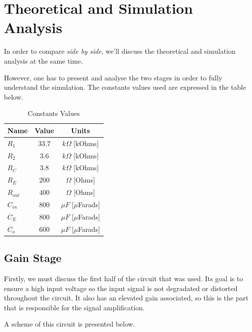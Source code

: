 \section{Theoretical and Simulation Analysis}
\label{sec:analysis}

In order to compare \textit{side by side}, we'll discuss the theoretical and simulation analysis at the same time.

However, one has to present and analyse the two stages in order to fully understand the simulation. The constants values used are expressed in the table below.

\begin{table}[h]
    \centering
    \begin{tabular}{|l|c|c|}
    \hline
    {\bf Name} & {\bf Value} & {\bf Units} \\ \hline
    $R_1$ & $33.7$ & $k\Omega$ [kOhms] \\ \hline
    $R_2$ & $3.6$ & $k\Omega$ [kOhms] \\ \hline
    $R_C$ & $3.8$ & $k\Omega$ [kOhms] \\ \hline
    $R_E$ & $200$ & $\Omega$ [Ohms] \\ \hline
    $R_{out}$ & $400$ & $\Omega$ [Ohms] \\ \hline
    $C_{in}$ & $800$ & $\mu F$ [$\mu$Farads]\\ \hline
    $C_E$ & $800$ & $\mu F$ [$\mu$Farads] \\ \hline
    $C_o$ & $600$ & $\mu F$ [$\mu$Farads] \\ \hline
    \end{tabular}
    \caption{Constants Values}
    \label{tab:constants}
\end{table}

\subsection{Gain Stage}
\label{subsec:stat}

Firstly, we must discuss the first half of the circuit that was used. Its goal is to ensure a high input voltage so the input signal is not degradated or distorted throughout the circuit. It also has an elevated gain associated, so this is the part that is responsible for the signal amplification.

A scheme of this circuit is presented below.

